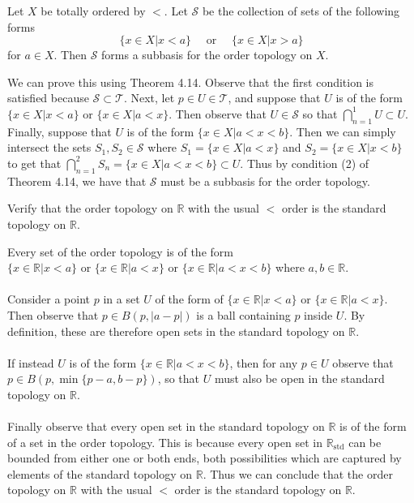 \documentclass[a4paper,12pt,twoside]{hmcpset}
\begin{document}
\begin{exercise}[Exercise 4.18]
Let $X$ be totally ordered by $<$. Let $\mathscr{S}$ be the collection
of sets of the following forms 
\[
\{x \in X | x < a\} \quad \text{ or } \quad \{x \in X | x > a\}
\]
for $a \in X$. Then $\mathscr{S}$ forms a subbasis for the order
topology on $X$. 
\end{exercise}

\begin{solution}
    We can prove this using Theorem 4.14. Observe that the first condition
    is satisfied because $\mathscr{S} \subset \mathscr{T}$. Next, let $p
    \in U \in \mathscr{T}$, and suppose that $U$ is of the form $\{x \in X
    | x < a\}$ or $\{x \in X | a < x\}$. Then observe that
    $U \in \mathscr{S}$ so that $\bigcap\limits_{n=1}^1 U \subset U$. Finally, suppose that
    $U$ is of the form $\{x \in X | a < x < b\}$. Then we can simply
    intersect the sets $S_1, S_2 \in \mathscr{S}$ where $S_1 = \{x \in X |
    a < x\}$ and $S_2 = \{x \in X | x < b\}$ to get that
    $\bigcap\limits_{n = 1}^2 S_n =
    \{x \in X | a < x < b\} \subset U$. Thus by condition (2) of Theorem
    4.14, we have that $\mathscr{S}$ must be a subbasis for the order
    topology.
\end{solution}

\begin{exercise}[Exercise 4.19]
Verify that the order topology on $\mathbb{R}$ with the usual $<$
order is the standard topology on $\mathbb{R}$. 
\end{exercise}

\begin{solution}
    Every set of the order topology is of the form $\{x \in \mathbb{R} | x < a\} \text{ or } \{x \in \mathbb{R} | a < x\}
\text{ or } \{x \in \mathbb{R} | a < x < b\}$ where $a, b \in
\mathbb{R}$. 
\\
\\
Consider a point $p$ in a set $U$ of the form of 
$\{x \in \mathbb{R} | x < a\} \text{ or } \{x \in \mathbb{R} | a <
x\}$. Then observe that $p \in B(p, |a - p|)$ is a ball containing $p$
inside $U$. By definition, these are therefore open sets in the
standard topology on $\mathbb{R}$. 
\\
\\
If instead $U$ is of the form $\{x \in \mathbb{R} | a < x < b\}$, then
for any $p \in U$ observe that $p \in B(p, \min\{p-a, b - p\})$, so that
$U$ must also be open in the standard topology on $\mathbb{R}$.
\\
\\
Finally observe that every open set in the standard topology on $\mathbb{R}$ is of the form of
a set in the order topology. This is because every open set in
$\mathbb{R}_\text{std}$ can be bounded from either one or both ends,
both possibilities which are captured by elements of the standard
topology on $\mathbb{R}$. Thus we can conclude that the order topology on $\mathbb{R}$ with the usual $<$
order is the standard topology on $\mathbb{R}$.
\end{solution}
\end{document}
